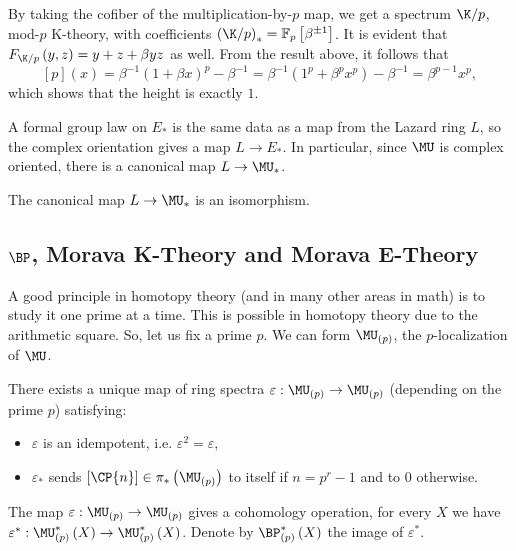 \begin{example}\label{k-thy-modp-height}
	By taking the cofiber of the multiplication-by-$p$ map, we get a spectrum $\K/p$, mod-$p$ K-theory, with coefficients $\left(\K/p\right)_* = \mathbb{F}_p \left[\beta^{\pm 1}\right]$.
	It is evident that $F_{\K/p}\left(y,z\right) = y + z + \beta y z$ as well.
	From the result above, it follows that
	$$
	\left[p\right]\left(x\right)
	= \beta^{-1} \left(1 + \beta x\right)^p - \beta^{-1}
	= \beta^{-1} \left(1^p + \beta^p x^p\right) - \beta^{-1}
	= \beta^{p-1} x^p,
	$$
	which shows that the height is exactly $1$.
\end{example}

A formal group law on $E_*$ is the same data as a map from the Lazard ring $L$, so the complex orientation gives a map $L \to E_*$.
In particular, since $\MU$ is complex oriented, there is a canonical map $L \to \MU_*$.

\begin{theorem}\label{quillen-theorem}
	The canonical map $L \to \MU_*$ is an isomorphism.
\end{theorem}



\subsection{\texorpdfstring{$\BP$}{BP}, Morava K-Theory and Morava E-Theory}

A good principle in homotopy theory (and in many other areas in math) is to study it one prime at a time.
This is possible in homotopy theory due to the arithmetic square.
So, let us fix a prime $p$.
We can form $\MU_{\left(p\right)}$, the $p$-localization of $\MU$.

\begin{theorem}
	There exists a unique map of ring spectra $\varepsilon: \MU_{\left(p\right)} \to \MU_{\left(p\right)}$ (depending on the prime $p$) satisfying:
	\begin{itemize}
		\item $\varepsilon$ is an idempotent, i.e. $\varepsilon^2 = \varepsilon$,
		\item $\varepsilon_*$ sends $\left[\CP{n}\right] \in \pi_*\left(\MU_{\left(p\right)}\right)$ to itself if $n = p^r-1$ and to $0$ otherwise.
	\end{itemize}
\end{theorem}

The map $\varepsilon: \MU_{\left(p\right)} \to \MU_{\left(p\right)}$ gives a cohomology operation, for every $X$ we have $\varepsilon^*: \MU_{\left(p\right)}^*\left(X\right) \to \MU_{\left(p\right)}^*\left(X\right)$.
Denote by $\BP_{\left(p\right)}^*\left(X\right)$ the image of $\varepsilon^*$.

